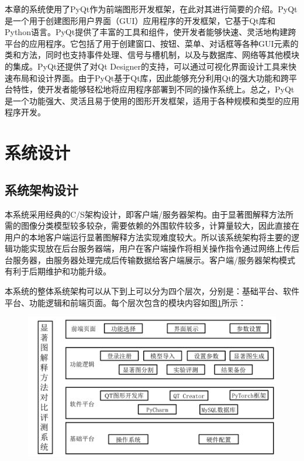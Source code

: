 本章的系统使用了PyQt作为前端图形开发框架，在此对其进行简要的介绍。PyQt是一个用于创建图形用户界面（GUI）应用程序的开发框架，它基于Qt库和Python语言。PyQt提供了丰富的工具和组件，使开发者能够快速、灵活地构建跨平台的应用程序。它包括了用于创建窗口、按钮、菜单、对话框等各种GUI元素的类和方法，同时也支持事件处理、信号与槽机制，以及与数据库、网络等其他模块的集成。PyQt还提供了对Qt Designer的支持，可以通过可视化界面设计工具来快速布局和设计界面。由于PyQt基于Qt库，因此能够充分利用Qt的强大功能和跨平台特性，使开发者能够轻松地将应用程序部署到不同的操作系统上。总之，PyQt是一个功能强大、灵活且易于使用的图形开发框架，适用于各种规模和类型的应用程序开发。

\section{系统设计}
\subsection{系统架构设计}
本系统采用经典的C/S架构设计，即客户端/服务器架构。由于显著图解释方法所需的图像分类模型较多较杂，需要依赖的外围软件较多，计算量较大，因此直接在用户的本地客户端运行显著图解释方法实现难度较大。所以该系统架构将主要的逻辑功能实现放在后台服务器端，用户在客户端操作将相关操作指令通过网络上传后台服务器，由服务器处理完成后传输数据给客户端展示。客户端/服务器架构模式有利于后期维护和功能升级。

本系统的整体系统架构可以从下到上可以分为四个层次，分别是：基础平台、软件平台、功能逻辑和前端页面。每个层次包含的模块内容如图\ref{fig:sys}所示：

\begin{figure}[h]
	\centering 
	\includegraphics[width=12 cm]{fig/ch5/sys.png}
	\label{fig:sys}
\end{figure}
